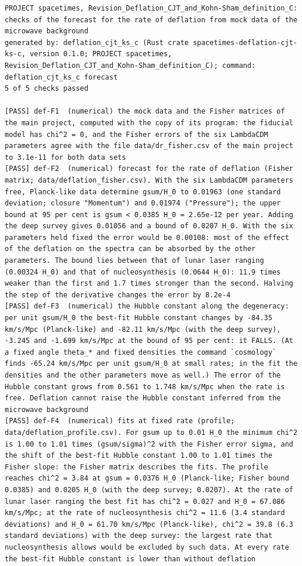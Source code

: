 \documentclass[
  10pt,
]{article}
\begin{document}
\begin{verbatim}
PROJECT spacetimes, Revision_Deflation_CJT_and_Kohn-Sham_definition_C: checks of the forecast for the rate of deflation from mock data of the microwave background
generated by: deflation_cjt_ks_c (Rust crate spacetimes-deflation-cjt-ks-c, version 0.1.0; PROJECT spacetimes, Revision_Deflation_CJT_and_Kohn-Sham_definition_C); command: deflation_cjt_ks_c forecast
5 of 5 checks passed

[PASS] def-F1  (numerical) the mock data and the Fisher matrices of the main project, computed with the copy of its program: the fiducial model has chi^2 = 0, and the Fisher errors of the six LambdaCDM parameters agree with the file data/dr_fisher.csv of the main project to 3.1e-11 for both data sets
[PASS] def-F2  (numerical) forecast for the rate of deflation (Fisher matrix; data/deflation_fisher.csv). With the six LambdaCDM parameters free, Planck-like data determine gsum/H_0 to 0.01963 (one standard deviation; closure "Momentum") and 0.01974 ("Pressure"); the upper bound at 95 per cent is gsum < 0.0385 H_0 = 2.65e-12 per year. Adding the deep survey gives 0.01056 and a bound of 0.0207 H_0. With the six parameters held fixed the error would be 0.00108: most of the effect of the deflation on the spectra can be absorbed by the other parameters. The bound lies between that of lunar laser ranging (0.00324 H_0) and that of nucleosynthesis (0.0644 H_0): 11.9 times weaker than the first and 1.7 times stronger than the second. Halving the step of the derivative changes the error by 8.2e-4
[PASS] def-F3  (numerical) the Hubble constant along the degeneracy: per unit gsum/H_0 the best-fit Hubble constant changes by -84.35 km/s/Mpc (Planck-like) and -82.11 km/s/Mpc (with the deep survey), -3.245 and -1.699 km/s/Mpc at the bound of 95 per cent: it FALLS. (At a fixed angle theta_* and fixed densities the command `cosmology` finds -65.24 km/s/Mpc per unit gsum/H_0 at small rates; in the fit the densities and the other parameters move as well.) The error of the Hubble constant grows from 0.561 to 1.748 km/s/Mpc when the rate is free. Deflation cannot raise the Hubble constant inferred from the microwave background
[PASS] def-F4  (numerical) fits at fixed rate (profile; data/deflation_profile.csv). For gsum up to 0.01 H_0 the minimum chi^2 is 1.00 to 1.01 times (gsum/sigma)^2 with the Fisher error sigma, and the shift of the best-fit Hubble constant 1.00 to 1.01 times the Fisher slope: the Fisher matrix describes the fits. The profile reaches chi^2 = 3.84 at gsum = 0.0376 H_0 (Planck-like; Fisher bound 0.0385) and 0.0205 H_0 (with the deep survey; 0.0207). At the rate of lunar laser ranging the best fit has chi^2 = 0.027 and H_0 = 67.086 km/s/Mpc; at the rate of nucleosynthesis chi^2 = 11.6 (3.4 standard deviations) and H_0 = 61.70 km/s/Mpc (Planck-like), chi^2 = 39.8 (6.3 standard deviations) with the deep survey: the largest rate that nucleosynthesis allows would be excluded by such data. At every rate the best-fit Hubble constant is lower than without deflation

\end{verbatim}
\end{document}
